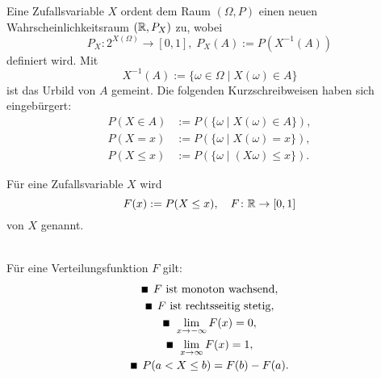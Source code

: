 \noindent
Eine Zufallsvariable $X$ ordent dem Raum $(\Omega,P)$
einen neuen Wahrscheinlichkeitsraum $(\mathbb R,P_X)$ zu, wobei
\begin{equation}
P_X\colon 2^{X(\Omega)}\to [0,1],\; P_X(A):=P(X^{-1}(A))
\end{equation}
definiert wird. Mit
\begin{equation}
X^{-1}(A) := \{\omega\in\Omega\mid X(\omega)\in A\}
\end{equation}
ist das Urbild von $A$ gemeint.
Die folgenden Kurzschreibweisen haben sich
eingebürgert:
\begin{align}
P(X\in A) &:= P(\{\omega\mid X(\omega)\in A\}),\\
P(X=x) &:= P(\{\omega\mid X(\omega)=x\}),\\
P(X\le x) &:= P(\{\omega\mid (X\omega)\le x\}).
\end{align}

\begin{definition}[Verteilungsfunktion]
Für eine Zufallsvariable $X$ wird
\begin{equation}
F(x):=P(X\le x),\quad F\colon\mathbb R\to [0,1]
\end{equation}
 von $X$ genannt.
\end{definition}

\noindent
{}\\
Für eine Verteilungsfunktion $F$ gilt:
\begin{gather}
\text{\scriptsize $\blacksquare$}\;\, F\text{ ist monoton wachsend},\\
\text{\scriptsize $\blacksquare$}\;\, F\text{ ist rechtsseitig stetig},\\
\text{\scriptsize $\blacksquare$}\;\, \lim\limits_{x\to -\infty} F(x) = 0,\\
\text{\scriptsize $\blacksquare$}\;\, \lim\limits_{x\to\infty} F(x)=1,\\
\text{\scriptsize $\blacksquare$}\;\, P(a<X\le b) = F(b)-F(a).
\end{gather}

